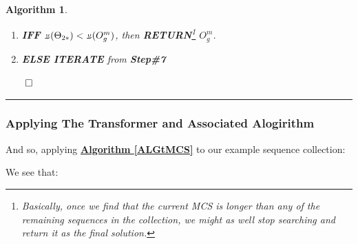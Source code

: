 \documentclass[a4paper, 18pt]{article} %
\newtheorem{alg}{Algorithm}
\newcommand{\invpi}{\rotatebox[origin=c]{180}{$\pi$}}
\begin{document}
\begin{alg}
\begin{enumerate}
{\begin{itemize}
\end{itemize}

}
\item \textbf{IFF} $\invpi(\Theta_{2*}) <  \invpi(O^m_g)$, then \textbf{RETURN}\footnote{Basically, once we find that the current MCS is longer than any of the remaining sequences in the collection, we might as well stop searching and return it as the final solution.}  $O^m_g$.
\item \textbf{ELSE ITERATE}  from \textbf{Step\#7}
\end{enumerate}


$\qed$
\end{alg}
\vspace{2em}

\noindent\rule{\textwidth}{0.4pt}

\vspace{2em}

\subsubsection{Applying The Transformer and Associated Alogirithm}
\label{SECAPPLYTRANSALG}

And so, applying \textbf{\hyperref[ALGtMCS]{Algorithm \ref{ALGtMCS}}} to our example sequence collection:

We see that:
\end{document}
